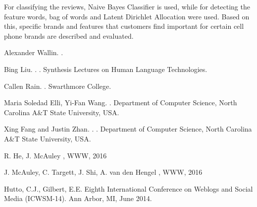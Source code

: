 \documentclass[11pt]{article}
\begin{document}
  For classifying the reviews, Naive Bayes Classifier is used, while for detecting the feature words, bag of words and Latent Dirichlet Allocation were used. Based on this, specific brands and features that customers find important for certain cell phone brands are described and evaluated.  
  
 
  
  \begin{thebibliography}{}
  
  Alexander Wallin.
  .
  
  
  Bing Liu.
  .
  .
  \newblock Synthesis Lectures on Human Language Technologies.
  
  
  Callen Rain.
  .
  \newblock Swarthmore College.
  
  
  Maria Soledad Elli, Yi-Fan Wang.
  .
  \newblock Department of Computer Science, North Carolina A\&T State University, USA.
  
  Xing Fang and Justin Zhan.
  .
  .
  \newblock Department of Computer Science, North Carolina A\&T State University, USA.
  
  
  R. He, J. McAuley
  ,
  \newblock WWW, 2016
  
  
  J. McAuley, C. Targett, J. Shi, A. van den Hengel
  ,
  \newblock WWW, 2016
  
  Hutto, C.J., Gilbert, E.E.
  \newblock Eighth International Conference on Weblogs and Social Media (ICWSM-14). Ann Arbor, MI, June 2014. 
  
  \end{thebibliography}


  
\end{document}
